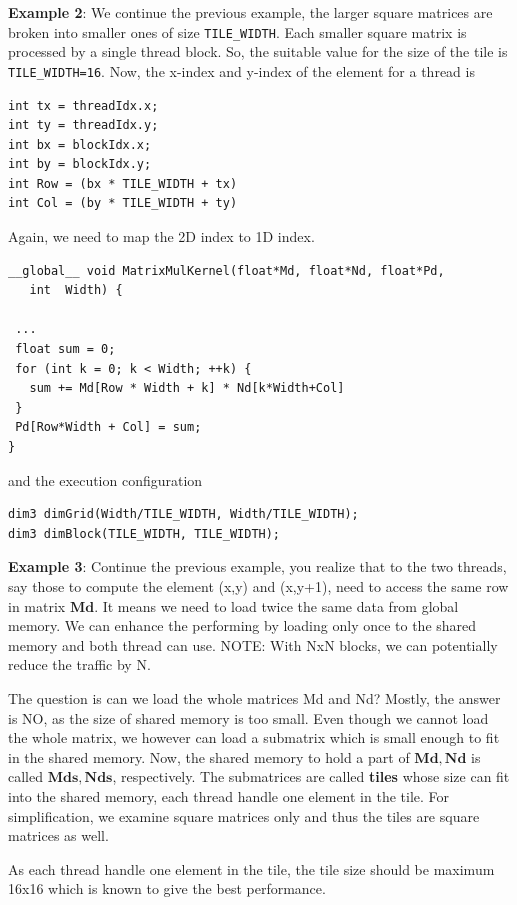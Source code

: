 {\bf Example 2}: We continue the previous example, the larger square
matrices are broken into smaller ones of size \verb!TILE_WIDTH!. Each
smaller square matrix is processed by a single thread block. So, the
suitable value for the size of the tile is \verb!TILE_WIDTH=16!. Now,
the x-index and y-index of the element for a thread is
\begin{lstlisting}
int tx = threadIdx.x;
int ty = threadIdx.y;
int bx = blockIdx.x;
int by = blockIdx.y;
int Row = (bx * TILE_WIDTH + tx)
int Col = (by * TILE_WIDTH + ty)
\end{lstlisting}
Again, we need to map the 2D index to 1D index.
\begin{lstlisting}
__global__ void MatrixMulKernel(float*Md, float*Nd, float*Pd, 
   int  Width) {

 ...
 float sum = 0;
 for (int k = 0; k < Width; ++k) {
   sum += Md[Row * Width + k] * Nd[k*Width+Col] 
 }
 Pd[Row*Width + Col] = sum;
}
\end{lstlisting}
and the execution configuration
\begin{lstlisting}
dim3 dimGrid(Width/TILE_WIDTH, Width/TILE_WIDTH);
dim3 dimBlock(TILE_WIDTH, TILE_WIDTH);
\end{lstlisting}

{\bf Example 3}: Continue the previous example, you realize that to
the two threads, say those to compute the element (x,y) and (x,y+1),
need to access the same row in matrix $\mathbf{Md}$. It means we need
to load twice the same data from global memory. We can enhance the
performing by loading only once to the shared memory and both thread
can use. NOTE: With NxN blocks, we can potentially reduce the traffic
by N. 

The question is can we load the whole matrices Md and Nd? Mostly, the
answer is NO, as the size of shared memory is too small. Even though
we cannot load the whole matrix, we however can load a submatrix which
is small enough to fit in the shared memory. Now, the shared memory to
hold a part of $\mathbf{Md, Nd}$ is called $\mathbf{Mds, Nds}$,
respectively. The submatrices are called {\bf tiles} whose size can
fit into the shared memory, each thread handle one element in the
tile. For simplification, we examine square matrices only and thus the
tiles are square matrices as well. 

As each thread handle one element in the tile, the tile size should
be maximum 16x16 which is known to give the best performance. 

